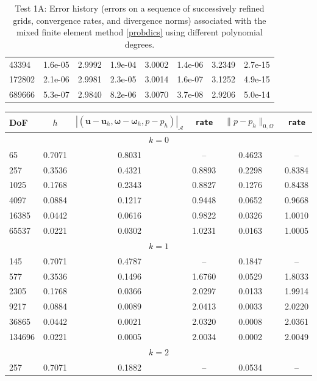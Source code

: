 \documentclass[reqno,a4paper]{article}
\numberwithin{equation}{section}
\newcommand\bu{\boldsymbol{u}}
\newcommand\bomega{\boldsymbol{\omega}}
\begin{document}
\begin{table}[t]
\begin{center}
{\begin{tabular}{|l|c|c|c|c|c|c|c|}
43394 & 1.6e-05 & 2.9992 & 1.9e-04 &    3.0002 & 1.4e-06 & 3.2349 & 2.7e-15\\
172802  & 2.1e-06 & 2.9981 & 2.3e-05 & 3.0014 & 1.6e-07 & 3.1252 & 4.9e-15\\
689666 & 5.3e-07 & 2.9840 & 8.2e-06 & 3.0070 & 3.7e-08 & 2.9206 &5.0e-14\\
\hline
\end{tabular}}\end{center}
\caption{Test 1A: Error history (errors on a sequence of successively refined grids, convergence rates, and 
divergence norms) associated with the mixed finite element method \eqref{probdics} using different 
polynomial degrees.} \label{table01}
\end{table}


\begin{table}[h]
\begin{center}
{\small \begin{tabular}{|l|c|c|c|c|c|}
\hline
DoF  & $h$ &   $|(\bu-\bu_h,\bomega-\bomega_h,p-p_h)|_{\mathcal{A}}$  &  \texttt{rate}  &  $\|p-p_h\|_{0,\Omega}$  &  \texttt{rate}  \\  
\hline
\multicolumn{6}{|c|}{$k=0$}\\
\hline
65    & 0.7071 & 0.8031 &  --    & 0.4623 &   -- \\
257 & 0.3536 & 0.4321 & 0.8893 & 0.2298 & 0.8384\\
1025 & 0.1768 & 0.2343 & 0.8827 & 0.1276 & 0.8438\\
4097 & 0.0884 & 0.1217 & 0.9448 & 0.0652 & 0.9668\\
16385 & 0.0442 & 0.0616 & 0.9822 & 0.0326 & 1.0010\\
65537 & 0.0221 & 0.0302 & 1.0231 & 0.0163 & 1.0005\\
\hline
\multicolumn{6}{|c|}{$k=1$}\\
\hline
145 & 0.7071 & 0.4787 &   -- & 0.1847 &    -- \\
577 & 0.3536 & 0.1496 & 1.6760 & 0.0529 & 1.8033 \\
2305 & 0.1768 & 0.0366 & 2.0297 & 0.0133 & 1.9914 \\
9217 & 0.0884 & 0.0089 & 2.0413 & 0.0033 & 2.0220 \\
36865 & 0.0442 & 0.0021 & 2.0320 & 0.0008 & 2.0361 \\
134696 & 0.0221 & 0.0005 & 2.0034 & 0.0002 & 2.0049 \\
\hline
\multicolumn{6}{|c|}{$k=2$}\\
\hline
257 & 0.7071 & 0.1882 &    -- & 0.0534 &    -- \\

\end{tabular}}
\end{center}
\end{table}
\end{document}
